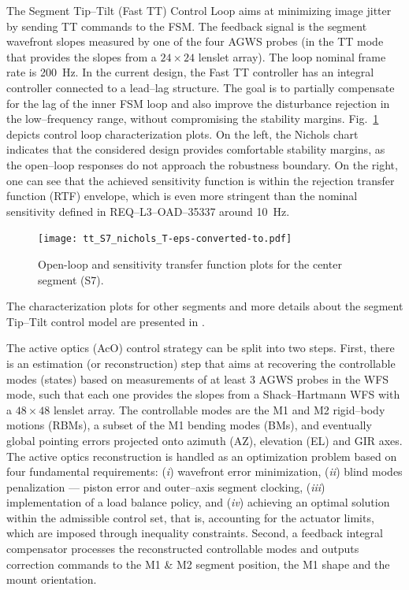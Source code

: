 \documentclass{gmto}
\begin{document}
The Segment Tip--Tilt (Fast TT) Control Loop aims at minimizing image jitter by sending TT commands to the FSM. The feedback signal is the segment wavefront slopes measured by one of the four AGWS probes (in the TT mode that provides the slopes from a $24 \times 24$ lenslet array). The loop nominal frame rate is \SI{200}{Hz}. In the current design, the Fast TT controller has an integral controller connected to a lead--lag structure. The goal is to partially compensate for the lag of the inner FSM loop and also improve the disturbance rejection in the low--frequency range, without compromising the stability margins. Fig.~\ref{fig:ttt_s7_plots} depicts control loop characterization plots. On the left, the Nichols chart indicates that the considered design provides comfortable stability margins, as the open--loop responses do not approach the robustness boundary. On the right, one can see that the achieved sensitivity function is within the rejection transfer function (RTF) envelope, which is even more stringent than the nominal sensitivity defined in REQ--L3--OAD--35337 around \SI{10}{Hz}.
%
\begin{figure}[!htb]
  \centering
  \texttt{[image: tt\_S7\_nichols\_T-eps-converted-to.pdf]}
  \caption[Open-loop and sensitivity transfer function plots for the center segment.]{Open-loop and sensitivity transfer function plots for the center segment (S7).}
  \label{fig:ttt_s7_plots}
\end{figure}
The characterization plots for other segments and more details about the segment Tip--Tilt control model are presented in \cite[Section~4.3]{GMT.DOC.05154}.


The active optics (AcO) control strategy can be split into two steps. %
First, there is an estimation (or reconstruction) step that aims at recovering the controllable modes (states) based on measurements of at least 3 AGWS probes in the WFS mode, such that each one provides the slopes from a Shack--Hartmann WFS with a $48 \times 48$ lenslet array. The controllable modes are the M1 and M2 rigid--body motions (RBMs), a subset of the M1 bending modes (BMs), and eventually global pointing errors projected onto azimuth (AZ), elevation (EL) and GIR axes. The active optics reconstruction is handled as an optimization problem based on four fundamental requirements: ({\it i}) wavefront error minimization, ({\it ii}) blind modes penalization --- piston error and outer--axis segment clocking, ({\it iii}) implementation of a load balance policy, and ({\it iv}) achieving an optimal solution within the admissible control set, that is, accounting for the actuator limits, which are imposed through inequality constraints. Second, a feedback integral compensator processes the reconstructed controllable modes and outputs correction commands to the M1 \& M2 segment position, the M1 shape and the mount orientation.
\end{document}
